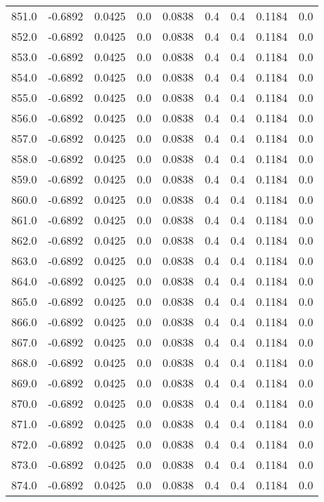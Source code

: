 \begin{longtable}{lrrrrrrrr}
851.0 & -0.6892 & 0.0425 & 0.0 & 0.0838 & 0.4 & 0.4 & 0.1184 & 0.0 \\
852.0 & -0.6892 & 0.0425 & 0.0 & 0.0838 & 0.4 & 0.4 & 0.1184 & 0.0 \\
853.0 & -0.6892 & 0.0425 & 0.0 & 0.0838 & 0.4 & 0.4 & 0.1184 & 0.0 \\
854.0 & -0.6892 & 0.0425 & 0.0 & 0.0838 & 0.4 & 0.4 & 0.1184 & 0.0 \\
855.0 & -0.6892 & 0.0425 & 0.0 & 0.0838 & 0.4 & 0.4 & 0.1184 & 0.0 \\
856.0 & -0.6892 & 0.0425 & 0.0 & 0.0838 & 0.4 & 0.4 & 0.1184 & 0.0 \\
857.0 & -0.6892 & 0.0425 & 0.0 & 0.0838 & 0.4 & 0.4 & 0.1184 & 0.0 \\
858.0 & -0.6892 & 0.0425 & 0.0 & 0.0838 & 0.4 & 0.4 & 0.1184 & 0.0 \\
859.0 & -0.6892 & 0.0425 & 0.0 & 0.0838 & 0.4 & 0.4 & 0.1184 & 0.0 \\
860.0 & -0.6892 & 0.0425 & 0.0 & 0.0838 & 0.4 & 0.4 & 0.1184 & 0.0 \\
861.0 & -0.6892 & 0.0425 & 0.0 & 0.0838 & 0.4 & 0.4 & 0.1184 & 0.0 \\
862.0 & -0.6892 & 0.0425 & 0.0 & 0.0838 & 0.4 & 0.4 & 0.1184 & 0.0 \\
863.0 & -0.6892 & 0.0425 & 0.0 & 0.0838 & 0.4 & 0.4 & 0.1184 & 0.0 \\
864.0 & -0.6892 & 0.0425 & 0.0 & 0.0838 & 0.4 & 0.4 & 0.1184 & 0.0 \\
865.0 & -0.6892 & 0.0425 & 0.0 & 0.0838 & 0.4 & 0.4 & 0.1184 & 0.0 \\
866.0 & -0.6892 & 0.0425 & 0.0 & 0.0838 & 0.4 & 0.4 & 0.1184 & 0.0 \\
867.0 & -0.6892 & 0.0425 & 0.0 & 0.0838 & 0.4 & 0.4 & 0.1184 & 0.0 \\
868.0 & -0.6892 & 0.0425 & 0.0 & 0.0838 & 0.4 & 0.4 & 0.1184 & 0.0 \\
869.0 & -0.6892 & 0.0425 & 0.0 & 0.0838 & 0.4 & 0.4 & 0.1184 & 0.0 \\
870.0 & -0.6892 & 0.0425 & 0.0 & 0.0838 & 0.4 & 0.4 & 0.1184 & 0.0 \\
871.0 & -0.6892 & 0.0425 & 0.0 & 0.0838 & 0.4 & 0.4 & 0.1184 & 0.0 \\
872.0 & -0.6892 & 0.0425 & 0.0 & 0.0838 & 0.4 & 0.4 & 0.1184 & 0.0 \\
873.0 & -0.6892 & 0.0425 & 0.0 & 0.0838 & 0.4 & 0.4 & 0.1184 & 0.0 \\
874.0 & -0.6892 & 0.0425 & 0.0 & 0.0838 & 0.4 & 0.4 & 0.1184 & 0.0 \\

\end{longtable}

